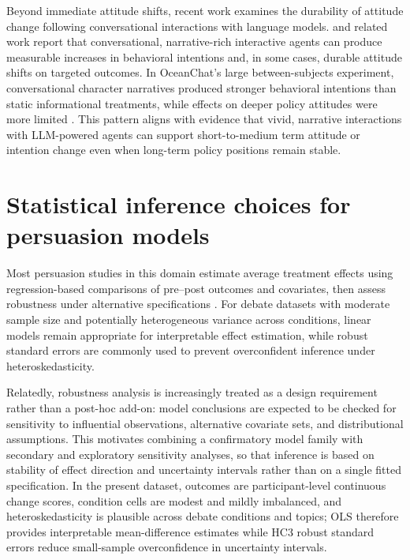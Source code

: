 Beyond immediate attitude shifts, recent work examines the durability of attitude change
following conversational interactions with language models.
\textcite{pataranutaporn2025_oceanchat} and related work report that conversational, narrative-rich
interactive agents can produce measurable increases in behavioral intentions and, in
some cases, durable attitude shifts on targeted outcomes. In OceanChat's large
between-subjects experiment, conversational character narratives produced stronger
behavioral intentions than static informational treatments, while effects on deeper
policy attitudes were more limited \cite{pataranutaporn2025_oceanchat}. This pattern aligns with
evidence that vivid, narrative interactions with LLM-powered agents can support
short-to-medium term attitude or intention change even when long-term policy
positions remain stable.
\section{Statistical inference choices for persuasion models}

Most persuasion studies in this domain estimate average treatment effects using
regression-based comparisons of pre--post outcomes and covariates, then assess
robustness under alternative specifications
\cite{argyle2025_testing_political_persuasion,durmus2024_measuring_persuasiveness}.
For debate datasets with moderate sample size and potentially heterogeneous
variance across conditions, linear models remain appropriate for interpretable
effect estimation, while robust standard errors are commonly used to prevent
overconfident inference under heteroskedasticity.

Relatedly, robustness analysis is increasingly treated as a design requirement
rather than a post-hoc add-on: model conclusions are expected to be checked for
sensitivity to influential observations, alternative covariate sets, and
distributional assumptions. This motivates combining a confirmatory model family
with secondary and exploratory sensitivity analyses, so that inference is based
on stability of effect direction and uncertainty intervals rather than on a
single fitted specification. In the present dataset, outcomes are participant-level
continuous change scores, condition cells are modest and mildly imbalanced, and
heteroskedasticity is plausible across debate conditions and topics; OLS therefore
provides interpretable mean-difference estimates while HC3 robust standard errors
reduce small-sample overconfidence in uncertainty intervals.

